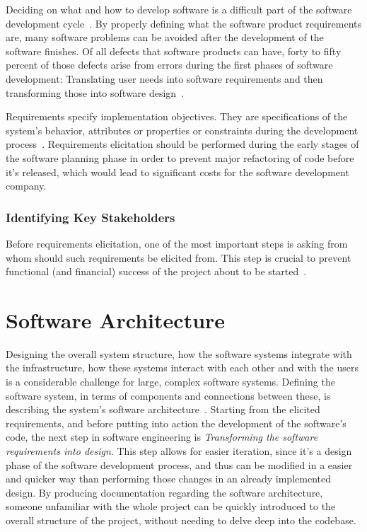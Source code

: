 Deciding on what and how to develop software is a difficult part of the software development cycle~\Parencite{pacheco_garcía_reyes_2018}.
By properly defining what the software product requirements are, many software problems can be avoided after the development of the software finishes. Of all defects that software products can have, forty to fifty percent of those defects arise from errors during the first phases of software development: Translating user needs into software requirements and then transforming those into software design~\Parencite{eugene_wiegers_beatty_2013}. 

Requirements specify implementation objectives. They are specifications of the system's behavior, attributes or properties or constraints during the development process~\Parencite{sommerville_sawyer_1997}. Requirements elicitation should be performed during the early stages of the software planning phase in order to prevent major refactoring of code before it's released, which would lead to significant costs for the software development company.

\subsubsection*{Identifying Key Stakeholders}\label{state-of-the-art:sss:identifying-key-stakeholders}

Before requirements elicitation, one of the most important steps is asking from whom should such requirements be elicited from. This step is crucial to prevent functional (and financial) success of the project about to be started~\Parencite{lewellen_2020}.


\section{Software Architecture}\label{state-of-the-art:s:software-architecture}

Designing the overall system structure, how the software systems integrate with the infrastructure, how these systems interact with each other and with the users is a considerable challenge for large, complex software systems. Defining the software system, in terms of components and connections between these, is describing the system's software architecture~\Parencite{hasselbring2018software}. Starting from the elicited requirements, and before putting into action the development of the software's code, the next step in software engineering is \textit{Transforming the software requirements into design}. This step allows for easier iteration, since it's a design phase of the software development process, and thus can be modified in a easier and quicker way than performing those changes in an already implemented design.
By producing documentation regarding the software architecture, someone unfamiliar with the whole project can be quickly introduced to the overall structure of the project, without needing to delve deep into the codebase.

